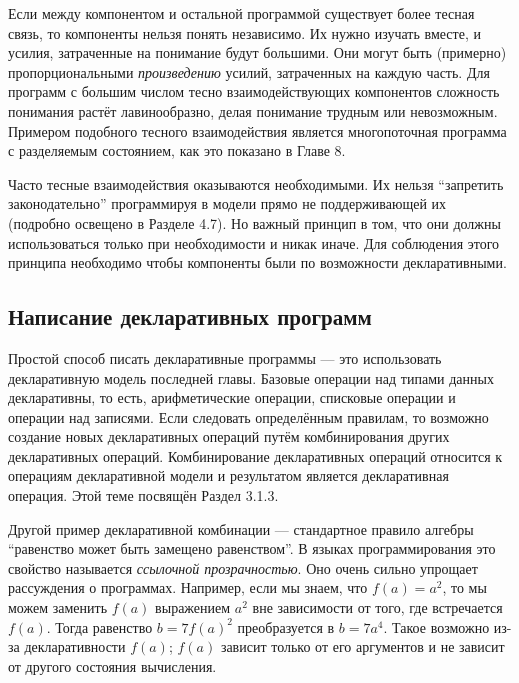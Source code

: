 Если между компонентом и остальной программой существует более тесная связь, то компоненты нельзя понять независимо. Их нужно изучать вместе, и усилия, затраченные на понимание будут большими. Они могут быть (примерно) пропорциональными \emph{произведению} усилий, затраченных на каждую часть. Для программ с большим числом тесно взаимодействующих компонентов сложность понимания растёт лавинообразно, делая понимание трудным или невозможным. Примером подобного тесного взаимодействия является многопоточная программа с разделяемым состоянием, как это показано в Главе 8.

Часто тесные взаимодействия оказываются необходимыми. Их нельзя ``запретить законодательно'' программируя в модели прямо не поддерживающей их (подробно освещено в Разделе 4.7). Но важный принцип в том, что они должны использоваться только при необходимости и никак иначе. Для соблюдения этого принципа необходимо чтобы компоненты были по возможности декларативными.

\subsection*{Написание декларативных программ}

Простой способ писать декларативные программы --- это использовать декларативную модель последней главы. Базовые операции над типами данных декларативны, то есть, арифметические операции, списковые операции и операции над записями. Если следовать определённым правилам, то возможно создание новых декларативных операций путём комбинирования других декларативных операций. Комбинирование декларативных операций относится к операциям декларативной модели и результатом является декларативная операция. Этой теме посвящён Раздел 3.1.3.

Другой пример декларативной комбинации --- стандартное правило алгебры ``равенство может быть замещено равенством''. В языках программирования это свойство называется \emph{ссылочной прозрачностью}. Оно очень сильно упрощает рассуждения о программах. Например, если мы знаем, что $f(a) = a^2$, то мы можем заменить $f(a)$ выражением $a^2$ вне зависимости от того, где встречается $f(a)$. Тогда равенство $b = 7f(a)^2$ преобразуется в $b = 7a^4$. Такое возможно из-за декларативности $f(a)$; $f(a)$ зависит только от его аргументов и не зависит от другого состояния вычисления.

